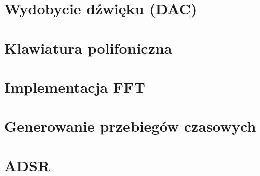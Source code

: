 \section{Wydobycie dźwięku (DAC)}




\section{Klawiatura polifoniczna}




\section{Implementacja FFT}


\section{Generowanie przebiegów czasowych}



\section{ADSR}